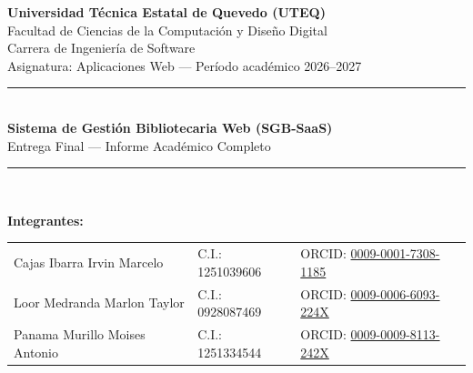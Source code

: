 \thispagestyle{empty}
\begin{titlepage}
\centering
\vspace*{1cm}

{\large\bfseries Universidad Técnica Estatal de Quevedo (UTEQ)}\\[0.2cm]
{\normalsize Facultad de Ciencias de la Computación y Diseño Digital}\\[0.1cm]
{\normalsize Carrera de Ingeniería de Software}\\[0.1cm]
{\normalsize Asignatura: Aplicaciones Web --- Período académico 2026--2027}\\[1.5cm]

\rule{0.8\linewidth}{1pt}\\[0.4cm]
{\Large\bfseries\color{verdeuteq} Sistema de Gestión Bibliotecaria Web (SGB-SaaS)}\\[0.3cm]
{\large Entrega Final --- Informe Académico Completo}\\[0.4cm]
\rule{0.8\linewidth}{1pt}\\[1cm]

\begin{center}
\badgeJAVA\quad\badgeANGULAR\quad\badgeSQL\quad\badgeREDIS\quad\badgeOWASP
\end{center}

\vspace{1cm}

{\normalsize\bfseries Integrantes:}\\[0.2cm]
\begin{tabular}{lll}
Cajas Ibarra Irvin Marcelo & C.I.: 1251039606 & \small ORCID: \href{https://orcid.org/0009-0001-7308-1185}{0009-0001-7308-1185} \\
Loor Medranda Marlon Taylor & C.I.: 0928087469 & \small ORCID: \href{https://orcid.org/0009-0006-6093-224X}{0009-0006-6093-224X} \\
Panama Murillo Moises Antonio & C.I.: 1251334544 & \small ORCID: \href{https://orcid.org/0009-0009-8113-242X}{0009-0009-8113-242X} \\
\end{tabular}\\[1cm]


\end{titlepage}
